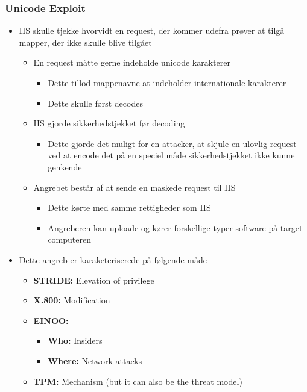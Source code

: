 \documentclass[a4, english]{article}
\begin{document}
\subsubsection{Unicode Exploit}
\begin{itemize}
	\item IIS skulle tjekke hvorvidt en request, der kommer udefra prøver at tilgå mapper, der ikke skulle blive tilgået  
  \begin{itemize}
  	\item En request måtte gerne indeholde unicode karakterer
    \begin{itemize}
    	\item Dette tillod mappenavne at indeholder internationale karakterer 
    	\item Dette skulle først decodes 
    \end{itemize}
    \item IIS gjorde sikkerhedstjekket før decoding    
    \begin{itemize}
    	\item Dette gjorde det muligt for en attacker, at skjule en ulovlig request ved at encode det på en speciel måde sikkerhedstjekket ikke kunne genkende
    \end{itemize}
    \item Angrebet består af at sende en maskede request til IIS 
    \begin{itemize}
    	\item Dette kørte med samme rettigheder som IIS
      \item Angreberen kan uploade og kører forskellige typer software på target computeren 
    \end{itemize}
  \end{itemize}
  \item Dette angreb er karaketeriserede på følgende måde  
  \begin{itemize}
	  \item \textbf{STRIDE:} Elevation of privilege 
  	\item \textbf{X.800:} Modification 
    \item \textbf{EINOO:}
    \begin{itemize}
    	\item \textbf{Who:} Insiders
      \item \textbf{Where:} Network attacks
    \end{itemize}
	  \item \textbf{TPM:} Mechanism (but it can also be the threat model)
  \end{itemize}
\end{itemize}
\end{document}
